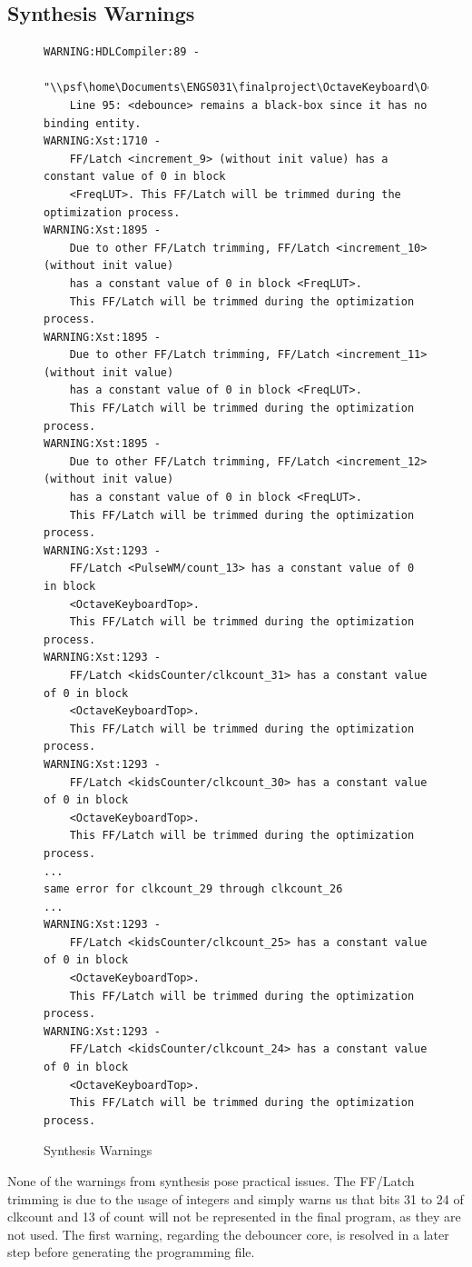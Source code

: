 \documentclass{article}
\begin{document}
    \subsection{Synthesis Warnings}
		\vspace{-2em}
    	\begin{figure}[H]
   			\caption{Synthesis Warnings}
   			\begin{lstlisting}
WARNING:HDLCompiler:89 - 
	"\\psf\home\Documents\ENGS031\finalproject\OctaveKeyboard\OctaveKeyboardTop.vhd" 
	Line 95: <debounce> remains a black-box since it has no binding entity.
WARNING:Xst:1710 - 
	FF/Latch <increment_9> (without init value) has a constant value of 0 in block 
	<FreqLUT>. This FF/Latch will be trimmed during the optimization process.
WARNING:Xst:1895 - 
	Due to other FF/Latch trimming, FF/Latch <increment_10> (without init value) 
	has a constant value of 0 in block <FreqLUT>. 
	This FF/Latch will be trimmed during the optimization process.
WARNING:Xst:1895 - 
	Due to other FF/Latch trimming, FF/Latch <increment_11> (without init value) 
	has a constant value of 0 in block <FreqLUT>. 
	This FF/Latch will be trimmed during the optimization process.
WARNING:Xst:1895 - 
	Due to other FF/Latch trimming, FF/Latch <increment_12> (without init value) 
	has a constant value of 0 in block <FreqLUT>. 
	This FF/Latch will be trimmed during the optimization process.
WARNING:Xst:1293 - 
	FF/Latch <PulseWM/count_13> has a constant value of 0 in block 
	<OctaveKeyboardTop>. 
	This FF/Latch will be trimmed during the optimization process.
WARNING:Xst:1293 - 
	FF/Latch <kidsCounter/clkcount_31> has a constant value of 0 in block 
	<OctaveKeyboardTop>. 
	This FF/Latch will be trimmed during the optimization process.
WARNING:Xst:1293 - 
	FF/Latch <kidsCounter/clkcount_30> has a constant value of 0 in block 
	<OctaveKeyboardTop>. 
	This FF/Latch will be trimmed during the optimization process.
...
same error for clkcount_29 through clkcount_26
...
WARNING:Xst:1293 - 
	FF/Latch <kidsCounter/clkcount_25> has a constant value of 0 in block 
	<OctaveKeyboardTop>. 
	This FF/Latch will be trimmed during the optimization process.
WARNING:Xst:1293 - 
	FF/Latch <kidsCounter/clkcount_24> has a constant value of 0 in block 
	<OctaveKeyboardTop>. 
	This FF/Latch will be trimmed during the optimization process.
   			\end{lstlisting}
   		\end{figure}

   		None of the warnings from synthesis pose practical issues. The FF/Latch trimming is due to the usage of integers and simply warns us that bits 31 to 24 of clkcount and 13 of count will not be represented in the final program, as they are not used. The first warning, regarding the debouncer core, is resolved in a later step before generating the programming file.
\end{document}
